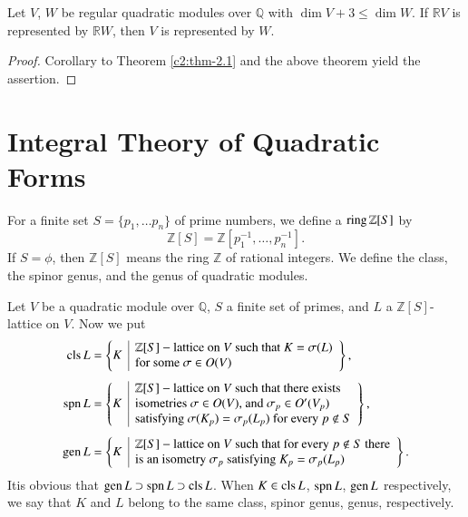 \begin{coro*}
Let $V$, $W$ be regular quadratic modules over $\mathbb{Q}$ with $\dim
V+3\leq \dim W$. If $\mathbb{R}V$ is represented by $\mathbb{R}W$,
then $V$ is represented by $W$.
\end{coro*}

\begin{proof}
Corollary to Theorem \ref{c2:thm-2.1} and the above theorem yield the
assertion. 
\end{proof}

\section{Integral Theory of Quadratic Forms}\label{c2:sec2.4}

For a finite set $S=\{p_{1},\ldots p_{n}\}$ of prime numbers, we
define a $\operatorname{ring} \mathbb{Z}[S]$ by
$$
\mathbb{Z}[S]=\mathbb{Z}[p^{-1}_{1},\ldots,p^{-1}_{n}].
$$
If $S=\phi$, then $\mathbb{Z}[S]$ means the ring $\mathbb{Z}$ of
rational integers. We define the class, the spinor genus, and the
genus of quadratic modules.

Let $V$ be a quadratic module over $\mathbb{Q}$, $S$ a finite set of
primes, and $L$ a $\mathbb{Z}[S]$-lattice on $V$. Now we put
\begin{align*}
\cls  L &= \left\{
\begin{array}{@{}c|l}
\multirow{2}{*}{$K$} & \mathbb{Z}[S]-\text{lattice on $V$ such that
  $K=\sigma(L)$}\\
 & \text{for some $\sigma\in O(V)$}
\end{array}
\right\},\\[4pt]
\spn  L &= \left\{
\begin{array}{@{}c|l}
\multirow{3}{*}{$K$} & \mathbb{Z}[S]-\text{lattice on $V$ such that
  there exists}\\
 & \text{isometries $\sigma\in O(V)$, and $\sigma_{p}\in O'(V_{p})$}\\
 & \text{satisfying $\sigma(K_{p})=\sigma_{p}(L_{p})$ for every
  $p\not\in S$}
\end{array}\right\},\\[4pt]
\gen  L &= \left\{
\begin{array}{@{}c|l}
\multirow{2}{*}{$K$} & \mathbb{Z}[S]-\text{lattice on $V$ such that
  for every $p\not\in S$ there}\\
 & \text{is an isometry $\sigma_{p}$ satisfying $K_{p}=\sigma_{p}(L_{p})$}
\end{array}
\right\}.
\end{align*}
It\pageoriginale is obvious that $\operatorname{gen} L\supset \operatorname{spn} L\supset \operatorname{cls}
L$. When $K\in\operatorname{cls} L$, $\operatorname{spn} L$, $\operatorname{gen} L$ respectively, we say that
$K$ and $L$ belong to the same class, spinor genus, genus,
respectively.

